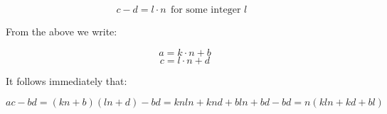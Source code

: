 \documentclass{article}
\begin{document}
\begin{equation*}
	c - d = l \cdot n \ \ \textrm{for some integer \(l\) }
\end{equation*}

From the above we write:

\begin{equation*}
	a = k \cdot n + b 
\end{equation*}
\begin{equation*}
	c = l \cdot n + d
\end{equation*}

It follows immediately that:

\begin{equation*}
	ac - bd = (kn + b)(ln + d) - bd = knln + knd + bln + bd - bd = n(kln +
	kd + bl)
\end{equation*}
\end{document}
